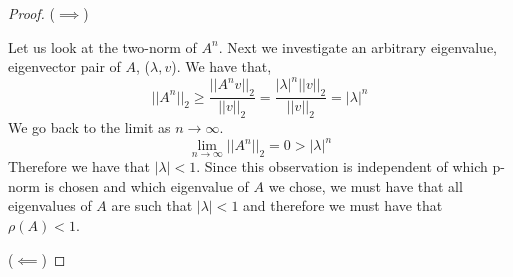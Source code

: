 \documentclass{article}
\begin{document}
\begin{enumerate}
\begin{proof}

    ($\implies$)

    Let us look at the two-norm of $A^n$. Next we investigate an arbitrary eigenvalue, eigenvector pair of $A$, ($\lambda, v$). We have that, 
    \[
        ||A^n||_2 \ge \frac{||A^nv||_2}{||v||_2} = \frac{|\lambda|^n||v||_2}{||v||_2} = |\lambda|^n 
    \]
    We go back to the limit as $n \to \infty$. 
    \[
        \lim_{n \to \infty} ||A^n||_2 = 0 > |\lambda|^n
    \]
    Therefore we have that $|\lambda| < 1$. Since this observation is independent of which p-norm is chosen and which eigenvalue of $A$ we chose, we must have that all eigenvalues of $A$ are such that $|\lambda| < 1$ and therefore we must have that $\rho(A) < 1$. 
    

    ($\impliedby$) 


\end{proof}
\end{enumerate}
\end{document}
